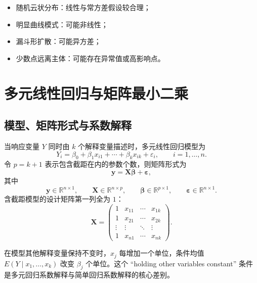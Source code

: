 \documentclass[11pt,a4paper]{article}
\theoremstyle{definition}
\theoremstyle{plain}
\theoremstyle{remark}
\begin{document}
\begin{methodbox}[看残差图的直觉]
\begin{itemize}
    \item 随机云状分布：线性与常方差假设较合理；
    \item 明显曲线模式：可能非线性；
    \item 漏斗形扩散：可能异方差；
    \item 少数点远离主体：可能存在异常值或高影响点。
\end{itemize}
\end{methodbox}

\section{多元线性回归与矩阵最小二乘}
\label{sec:mlr}

\subsection{模型、矩阵形式与系数解释}

当响应变量 $Y$ 同时由 $k$ 个解释变量描述时，多元线性回归模型为
\[
    Y_i=\beta_0+\beta_1x_{i1}+\cdots+\beta_kx_{ik}+\varepsilon_i,
    \qquad i=1,\ldots,n.
\]
令 $p=k+1$ 表示包含截距在内的参数个数，则矩阵形式为
\[
    \boldsymbol y=\boldsymbol X\boldsymbol\beta+\boldsymbol\varepsilon,
\]
其中
\[
    \boldsymbol y\in\mathbb R^{n\times 1},\qquad
    \boldsymbol X\in\mathbb R^{n\times p},\qquad
    \boldsymbol\beta\in\mathbb R^{p\times 1},\qquad
    \boldsymbol\varepsilon\in\mathbb R^{n\times 1}.
\]
含截距模型的设计矩阵第一列全为 $1$：
\[
    \boldsymbol X=
    \begin{pmatrix}
        1 & x_{11} & \cdots & x_{1k}\\
        1 & x_{21} & \cdots & x_{2k}\\
        \vdots & \vdots & \ddots & \vdots\\
        1 & x_{n1} & \cdots & x_{nk}
    \end{pmatrix}.
\]

\begin{keybox}[偏回归系数的解释]
在模型其他解释变量保持不变时，$x_j$ 每增加一个单位，条件均值
$E(Y\mid x_1,\ldots,x_k)$ 改变 $\beta_j$ 个单位。这个 ``holding other variables constant'' 条件是多元回归系数解释与简单回归系数解释的核心差别。
\end{keybox}
\end{document}
